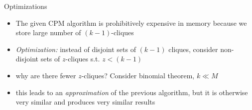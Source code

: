\documentclass[aspectratio=169, handout]{beamer}
\begin{document}
\begin{frame}{Optimizations}
\begin{itemize}
\item The given CPM algorithm is prohibitively expensive in memory because we store large number of $(k-1)$-cliques
\item \textit{Optimization:} instead of disjoint sets of $(k-1)$ cliques, consider non-disjoint sets of $z$-cliques s.t. $z < (k-1)$ \cite{CPMmem}
\pause
\item why are there fewer $z$-cliques? Consider binomial theorem, $k \ll M$
\item this leads to an \textit{approximation} of the previous algorithm, but it is otherwise very similar and produces very similar results
\end{itemize}
\end{frame}

\end{document}
